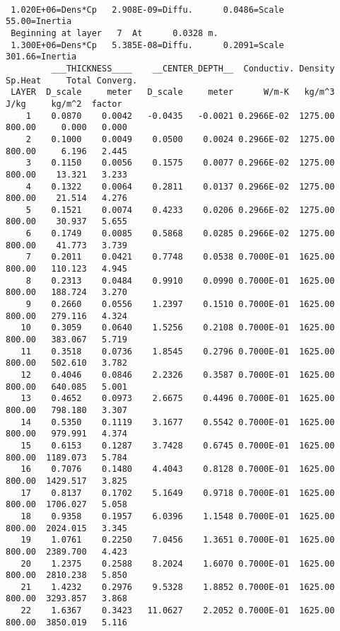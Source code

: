 \documentclass{article}
\begin{document}
 \vspace{-3.mm} 
\begin{verbatim}
  
 1.020E+06=Dens*Cp   2.908E-09=Diffu.      0.0486=Scale       55.00=Inertia
 Beginning at layer   7  At      0.0328 m.
 1.300E+06=Dens*Cp   5.385E-08=Diffu.      0.2091=Scale      301.66=Inertia
         ___THICKNESS____    __CENTER_DEPTH__  Conductiv. Density Sp.Heat     Total Converg.
 LAYER  D_scale     meter   D_scale     meter      W/m-K   kg/m^3   J/kg     kg/m^2  factor
    1    0.0870    0.0042   -0.0435   -0.0021 0.2966E-02  1275.00  800.00     0.000   0.000
    2    0.1000    0.0049    0.0500    0.0024 0.2966E-02  1275.00  800.00     6.196   2.445
    3    0.1150    0.0056    0.1575    0.0077 0.2966E-02  1275.00  800.00    13.321   3.233
    4    0.1322    0.0064    0.2811    0.0137 0.2966E-02  1275.00  800.00    21.514   4.276
    5    0.1521    0.0074    0.4233    0.0206 0.2966E-02  1275.00  800.00    30.937   5.655
    6    0.1749    0.0085    0.5868    0.0285 0.2966E-02  1275.00  800.00    41.773   3.739
    7    0.2011    0.0421    0.7748    0.0538 0.7000E-01  1625.00  800.00   110.123   4.945
    8    0.2313    0.0484    0.9910    0.0990 0.7000E-01  1625.00  800.00   188.724   3.270
    9    0.2660    0.0556    1.2397    0.1510 0.7000E-01  1625.00  800.00   279.116   4.324
   10    0.3059    0.0640    1.5256    0.2108 0.7000E-01  1625.00  800.00   383.067   5.719
   11    0.3518    0.0736    1.8545    0.2796 0.7000E-01  1625.00  800.00   502.610   3.782
   12    0.4046    0.0846    2.2326    0.3587 0.7000E-01  1625.00  800.00   640.085   5.001
   13    0.4652    0.0973    2.6675    0.4496 0.7000E-01  1625.00  800.00   798.180   3.307
   14    0.5350    0.1119    3.1677    0.5542 0.7000E-01  1625.00  800.00   979.991   4.374
   15    0.6153    0.1287    3.7428    0.6745 0.7000E-01  1625.00  800.00  1189.073   5.784
   16    0.7076    0.1480    4.4043    0.8128 0.7000E-01  1625.00  800.00  1429.517   3.825
   17    0.8137    0.1702    5.1649    0.9718 0.7000E-01  1625.00  800.00  1706.027   5.058
   18    0.9358    0.1957    6.0396    1.1548 0.7000E-01  1625.00  800.00  2024.015   3.345
   19    1.0761    0.2250    7.0456    1.3651 0.7000E-01  1625.00  800.00  2389.700   4.423
   20    1.2375    0.2588    8.2024    1.6070 0.7000E-01  1625.00  800.00  2810.238   5.850
   21    1.4232    0.2976    9.5328    1.8852 0.7000E-01  1625.00  800.00  3293.857   3.868
   22    1.6367    0.3423   11.0627    2.2052 0.7000E-01  1625.00  800.00  3850.019   5.116
\end{verbatim} 
\end{document}
